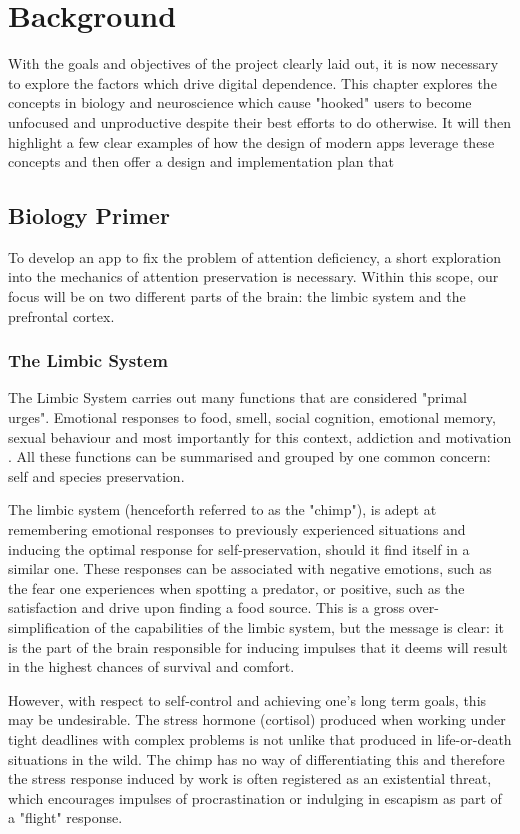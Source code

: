 \chapter{Background}
\label{ch:background}
With the goals and objectives of the project clearly laid out, it is now necessary to explore the factors which drive digital dependence. This chapter explores the concepts in biology and neuroscience which cause "hooked" users to become unfocused and unproductive despite their best efforts to do otherwise. It will then highlight a few clear examples of how the design of modern apps leverage these concepts and then offer a design and implementation plan that 

\section{Biology Primer}
To develop an app to fix the problem of attention deficiency, a short exploration into the mechanics of attention preservation is necessary.
Within this scope, our focus will be on two different parts of the brain: the limbic system and the prefrontal cortex.

\subsection{The Limbic System}
The Limbic System carries out many functions that are considered "primal urges". Emotional responses to food, smell, social cognition, emotional memory, sexual behaviour and most importantly for this context, addiction and motivation \cite{rajmohan2007limbic}. All these functions can be summarised and grouped by one common concern: self and species preservation.

The limbic system (henceforth referred to as the "chimp"), is adept at remembering emotional responses to previously experienced situations and inducing the optimal response for self-preservation, should it find itself in a similar one. These responses can be associated with negative emotions, such as the fear one experiences when spotting a predator, or positive, such as the satisfaction and drive upon finding a food source. This is a gross over-simplification of the capabilities of the limbic system, but the message is clear: it is the part of the brain responsible for inducing impulses that it deems will result in the highest chances of survival and comfort.

However, with respect to self-control and achieving one's long term goals, this may be undesirable. The stress hormone (cortisol) produced when working under tight deadlines with complex problems is not unlike that produced in life-or-death situations in the wild. The chimp has no way of differentiating this and therefore the stress response induced by work is often registered as an existential threat, which encourages impulses of procrastination or indulging in escapism as part of a "flight" response.

